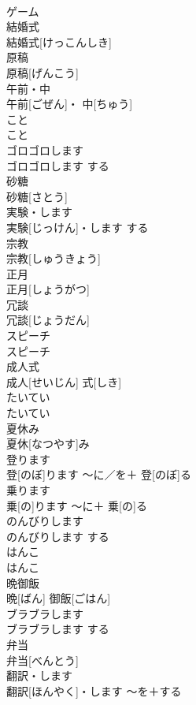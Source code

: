 \documentclass[8pt]{extreport}
\begin{document}
\begin{CJK}{UTF8}{min}
\\	ゲーム		
\\	結婚式	
\\	結婚式[けっこんしき]		
\\	原稿	
\\	原稿[げんこう]		
\\	午前・中	
\\	午前[ごぜん]・ 中[ちゅう]		
\\	こと	
\\	こと		
\\	ゴロゴロします	
\\	ゴロゴロします	する	
\\	砂糖	
\\	砂糖[さとう]		
\\	実験・します	
\\	実験[じっけん]・します	する	
\\	宗教	
\\	宗教[しゅうきょう]		
\\	正月	
\\	正月[しょうがつ]		
\\	冗談	
\\	冗談[じょうだん]		
\\	スピーチ	
\\	スピーチ		
\\	成人式	
\\	成人[せいじん] 式[しき]		
\\	たいてい	
\\	たいてい		
\\	夏休み	
\\	夏休[なつやす]み		
\\	登ります	
\\	登[のぼ]ります	〜に／を＋ 登[のぼ]る	
\\	乗ります	
\\	乗[の]ります	〜に＋ 乗[の]る	
\\	のんびりします	
\\	のんびりします	する	
\\	はんこ	
\\	はんこ		
\\	晩御飯	
\\	晩[ばん] 御飯[ごはん]		
\\	ブラブラします	
\\	ブラブラします	する	
\\	弁当	
\\	弁当[べんとう]		
\\	翻訳・します	
\\	翻訳[ほんやく]・します	〜を＋する	

\end{CJK}
\end{document}
